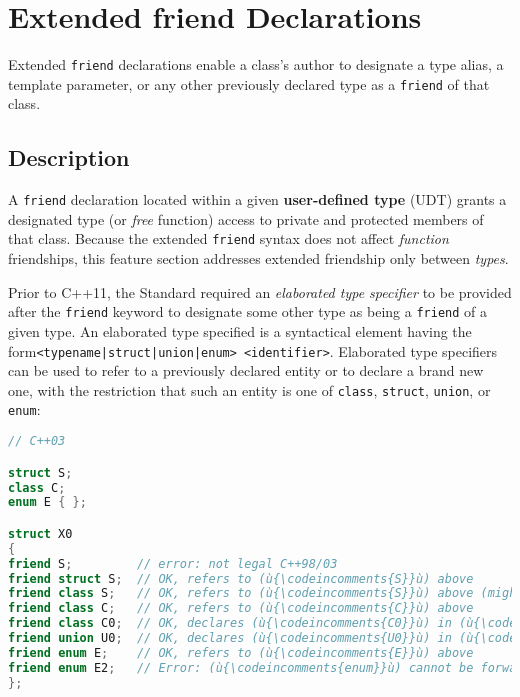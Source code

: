\newpage
\section[{\tt friend} '11]{Extended {\SecCode friend} Declarations}\label{extended-friend-declarations}

Extended \texttt{friend} declarations enable a class's author to
designate a type alias, a template parameter, or any other previously
declared type as a \texttt{friend} of that class.

\subsection[Description]{Description}\label{description-extendedfriend}

A \texttt{friend} declaration located within a given
\textbf{user-defined type} (UDT) grants a designated type (or
\emph{free} function) access to private and protected members of that
class. Because the extended \texttt{friend} syntax does not affect
\emph{function} friendships, this feature section addresses extended
friendship only between \emph{types}.

Prior to C++11, the Standard required an \emph{elaborated type
specifier} to be provided after the \texttt{friend} keyword to designate
some other type as being a \texttt{friend} of a given type. An
elaborated type specified is a syntactical element having the form\linebreak[4]
\mbox{\texttt{<typename|struct|union|enum>}~\texttt{<identifier>}}. Elaborated
type specifiers can be used to refer to a previously declared entity or
to declare a brand new one, with the restriction that such an entity is
one of \texttt{class}, \texttt{struct}, \texttt{union}, or
\texttt{enum}:

\begin{lstlisting}[language=C++]
// C++03

struct S;
class C;
enum E { };

struct X0
{
friend S;         // error: not legal C++98/03
friend struct S;  // OK, refers to (ù{\codeincomments{S}}ù) above
friend class S;   // OK, refers to (ù{\codeincomments{S}}ù) above (might warn)
friend class C;   // OK, refers to (ù{\codeincomments{C}}ù) above
friend class C0;  // OK, declares (ù{\codeincomments{C0}}ù) in (ù{\codeincomments{X0}}ù)'s namespace
friend union U0;  // OK, declares (ù{\codeincomments{U0}}ù) in (ù{\codeincomments{X0}}ù)'s namespace
friend enum E;    // OK, refers to (ù{\codeincomments{E}}ù) above
friend enum E2;   // Error: (ù{\codeincomments{enum}}ù) cannot be forward-declared.
};
\end{lstlisting}

